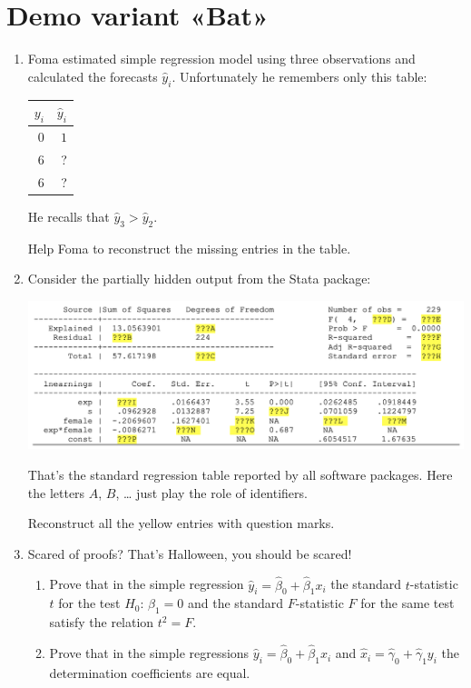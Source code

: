 \documentclass[12pt]{article}
\newcommand{\hb}{\hat\beta}
\newcommand{\hy}{\hat y}
\begin{document}
\section*{Demo variant «Bat»}
\begin{enumerate}
    \item %
    Foma estimated simple regression model using three observations and calculated the forecasts $\hat{y}_i$. 
    Unfortunately he remembers only this table:

    \begin{tabular}{rr}
    \toprule
    $y_i$ & $\hy_i$ \\
    \midrule
    $0$ & $1$ \\
    $6$ & ? \\
    $6$ & ? \\
    \bottomrule
    \end{tabular}
    
    He recalls that $\hat y_3 > \hat y_2$. 
    
    Help Foma to reconstruct the missing entries in the table. 
    
    \item Consider the partially hidden output from the Stata package:
    
    \begin{minipage}{\textwidth}
        \includegraphics[scale=0.6]{partial_stata_table.png}
    \end{minipage}

    That's the standard regression table reported by all software packages. 
    Here the letters $A$, $B$, \dots{ } just play the role of identifiers. 
    
    Reconstruct all the yellow entries with question marks. 
    

    \item Scared of proofs? That's Halloween, you should be scared!
    \begin{enumerate}
        \item Prove that in the simple regression $\hat y_i = \hb_0 + \hb_1 x_i$ the 
        standard $t$-statistic $t$ for the test $H_0$: $\beta_1 = 0$ and 
        the standard $F$-statistic $F$ for the same test satisfy the relation $t^2 = F$.
        \item Prove that in the simple regressions $\hat y_i = \hb_0 + \hb_1 x_i$ and 
        $\hat x_i = \hat{\gamma}_0 + \hat{\gamma}_1 y_i$ the determination coefficients are equal. 
    \end{enumerate}



\end{enumerate}
\end{document}
